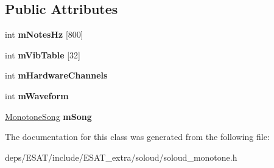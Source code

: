 \subsection*{Public Attributes}
\begin{DoxyCompactItemize}
\item 
\mbox{\label{class_so_loud_1_1_monotone_ae9457bde8afdc530f84ac285503b7973}} 
int {\bfseries m\+Notes\+Hz} \mbox{[}800\mbox{]}
\item 
\mbox{\label{class_so_loud_1_1_monotone_ab4a409741b4e71777b910e3808ff3d00}} 
int {\bfseries m\+Vib\+Table} \mbox{[}32\mbox{]}
\item 
\mbox{\label{class_so_loud_1_1_monotone_a88755b618ac5fb430bf44ae0da37f9bf}} 
int {\bfseries m\+Hardware\+Channels}
\item 
\mbox{\label{class_so_loud_1_1_monotone_ac9a718582a6d8ee99100c30e8299d881}} 
int {\bfseries m\+Waveform}
\item 
\mbox{\label{class_so_loud_1_1_monotone_adceb8944d5607a506b7fd57a9a40c5e7}} 
\mbox{\hyperlink{struct_so_loud_1_1_monotone_song}{Monotone\+Song}} {\bfseries m\+Song}
\end{DoxyCompactItemize}


The documentation for this class was generated from the following file\+:\begin{DoxyCompactItemize}
\item 
deps/\+E\+S\+A\+T/include/\+E\+S\+A\+T\+\_\+extra/soloud/soloud\+\_\+monotone.\+h\end{DoxyCompactItemize}
